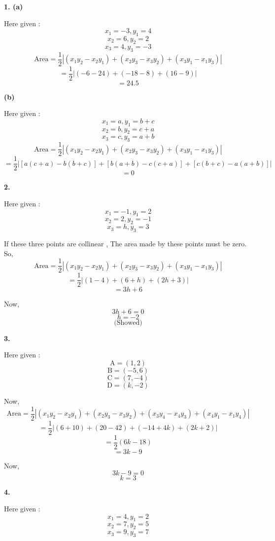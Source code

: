 \documentclass{article}
\begin{document}
\begin{flushleft}
\newpage
\textbf{1. \hspace{0.4cm}(a)}\par
\vspace{0.5cm}
 Here given : 
\[ x_1 = -3, y_1 = 4 \]
\[ x_2 = 6, y_2 = 2 \]
\[ x_3 = 4, y_3 = -3 \]
\[\text{Area} = \frac{1}{2} |(x_1y_2-x_2y_1)+(x_2y_3-x_3y_2)+(x_3y_1-x_1y_3)| \]
\[=\frac{1}{2} |(-6-24)+(-18-8)+(16-9)|\]
\[=24.5\]\par
\vspace{1cm}
\textbf{\hspace{1cm}(b)}\par
\vspace{0.5cm}
 Here given :
\[ x_1 = a, y_1 = b+c \]
\[ x_2 = b, y_2 = c+a \]
\[ x_3 = c, y_3 = a+b \]
\[\text{Area} = \frac{1}{2} |(x_1y_2-x_2y_1)+(x_2y_3-x_3y_2)+(x_3y_1-x_1y_3)| \]
\[=\frac{1}{2} |[a(c+a)-b(b+c)]+[b(a+b)-c(c+a)]+[c(b+c)-a(a+b)]|\]
\[=0\]\par
\vspace{1cm}
\textbf{2.}\par
\vspace{0.5cm}
Here given :
\[ x_1 = -1, y_1 = 2 \]
\[ x_2 = 2, y_2 = -1 \]
\[ x_3 = h, y_3 = 3 \]\par

If these three points are collinear , The area made by these points must be zero. So,
\[\text{Area} = \frac{1}{2} |(x_1y_2-x_2y_1)+(x_2y_3-x_3y_2)+(x_3y_1-x_1y_3)| \]
\[=\frac{1}{2} |(1-4)+(6+h)+(2h+3)|\]
\[=3h+6\]\par
Now,
\[3h+6=0\]
\[h=-2\]
\[\text{(Showed)}\]\par
\newpage
\textbf{3.}\par
\vspace{0.5cm}
Here given : 
\[\text{A}=(1,2)\]
\[\text{B}=(-5,6)\]
\[\text{C}=(7,-4)\]
\[\text{D}=(k,-2)\]\par
Now,
\[\text{Area} = \frac{1}{2} |(x_1y_2-x_2y_1)+(x_2y_3-x_3y_2)+(x_3y_4-x_4y_3)+(x_4y_1-x_1y_4)| \]
\[=\frac{1}{2}|(6+10)+(20-42)+(-14+4k)+(2k+2)|\]
\[=\frac{1}{2}(6k-18)\]
\[=3k-9\]\par
Now,
\[3k-9=0\]
\[k=3\]\par
\vspace{1cm}
\textbf{4.}\par
\vspace{0.5cm}
Here given : 
\[ x_1 = 4, y_1 = 2 \]
\[ x_2 = 7, y_2 = 5 \]
\[ x_3 = 9, y_3 = 7 \]\par


\end{flushleft}
\end{document}
